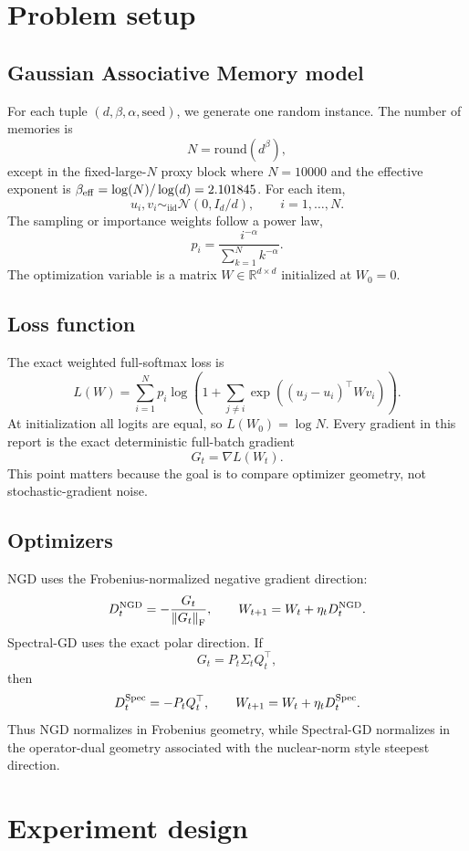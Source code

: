 \documentclass[11pt]{article}
\newcommand{\R}{\mathbb{R}}
\newcommand{\norm}[1]{\left\lVert #1 \right\rVert}
\newcommand{\F}{\mathrm{F}}
\begin{document}
\section{Problem setup}

\subsection{Gaussian Associative Memory model}

For each tuple $(d,\beta,\alpha,\mathrm{seed})$, we generate one random instance. The number of memories is
\[
  N = \mathrm{round}(d^\beta),
\]
except in the fixed-large-$N$ proxy block where $N=10000$ and the effective exponent is $\beta_{\rm eff}=\log(N)/\log(d)=2.101845$. For each item,
\[
  u_i,v_i\sim_{\mathrm{iid}}\mathcal{N}(0,I_d/d),
  \qquad i=1,\ldots,N.
\]
The sampling or importance weights follow a power law,
\[
  p_i=\frac{i^{-\alpha}}{\sum_{k=1}^N k^{-\alpha}}.
\]
The optimization variable is a matrix $W\in\R^{d\times d}$ initialized at $W_0=0$.

\subsection{Loss function}

The exact weighted full-softmax loss is
\[
  L(W)
  =
  \sum_{i=1}^N p_i
  \log\left(
    1+\sum_{j\neq i}\exp\left((u_j-u_i)^\top W v_i\right)
  \right).
\]
At initialization all logits are equal, so $L(W_0)=\log N$. Every gradient in this report is the exact deterministic full-batch gradient
\[
  G_t=\nabla L(W_t).
\]
This point matters because the goal is to compare optimizer geometry, not stochastic-gradient noise.

\subsection{Optimizers}

NGD uses the Frobenius-normalized negative gradient direction:
\[
  D_t^{\rm NGD}=-\frac{G_t}{\norm{G_t}_\F},
  \qquad
  W_{t+1}=W_t+\eta_t D_t^{\rm NGD}.
\]
Spectral-GD uses the exact polar direction. If
\[
  G_t=P_t\Sigma_tQ_t^\top,
\]
then
\[
  D_t^{\rm Spec}=-P_tQ_t^\top,
  \qquad
  W_{t+1}=W_t+\eta_t D_t^{\rm Spec}.
\]
Thus NGD normalizes in Frobenius geometry, while Spectral-GD normalizes in the operator-dual geometry associated with the nuclear-norm style steepest direction.

\section{Experiment design}
\end{document}
